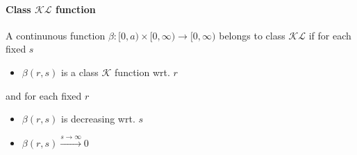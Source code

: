 \paragraph{Class $\mathcal{KL}$ function}
A continunous function $\beta : [0,a) \times [0,\infty) \rightarrow [0,\infty)$ belongs to class $\mathcal{KL}$ if for each fixed $s$
\begin{itemize}
	\item $\beta(r,s)$ is a class $\mathcal{K}$ function wrt. $r$
\end{itemize}
and for each fixed $r$
\begin{itemize}
	\item $\beta(r,s)$ is decreasing wrt. $s$
	\item $\beta(r,s) \xrightarrow{s \rightarrow \infty} 0$
\end{itemize}
